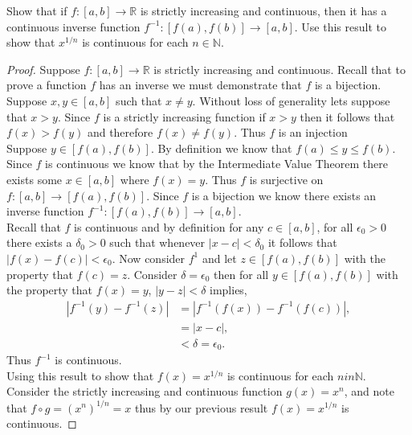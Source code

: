 \documentclass[12pt]{article}
\makeatletter
\theoremstyle{homework}
\newenvironment{exercise}[1]
{\def\@currentlabel{#1}\exercisecore}
{\endexercisecore}
\newcommand{\Reals}{\ensuremath{\mathbb R}}
\newcommand{\Nats}{\ensuremath{\mathbb N}}
\makeatother
\begin{document}
\begin{exercise}{6} Show that if $f:[a,b] \to \Reals$ is strictly increasing and continuous, then it has a continuous inverse function $f^{-1}:[f(a),f(b)] \to [a,b]$. Use this result to show that $x^{1/n}$ is continuous for each $n\in \Nats$.\\

\begin{proof}
  Suppose $f:[a,b] \to \Reals$ is strictly increasing and continuous. Recall that to prove a function $f$ has an inverse we must demonstrate
  that $f$ is a bijection.\\
  
  Suppose $x,y \in [a,b]$ such that $x \neq y$. Without loss of generality lets suppose that $x > y$. Since $f$ is a strictly increasing function if 
  $x > y$ then it follows that $f(x) > f(y)$ and therefore $f(x) \neq f(y)$. Thus $f$ is an injection\\

  Suppose $y \in  [f(a),f(b)]$. By definition we know that $f(a) \le y \le f(b)$. Since $f$ is continuous we know that by the Intermediate Value Theorem there exists some 
  $x \in [a,b]$ where $f(x) = y$. Thus $f$ is surjective on $f:[a,b] \to [f(a),f(b)]$. Since $f$ is a bijection we know there exists an inverse function $f^{-1}:[f(a),f(b)] \to [a,b]$.\\

 Recall that $f$ is continuous and by definition for any $c \in [a,b]$, for all $\epsilon_0 >0$ there exists a $\delta_0> 0$ such that whenever $|x - c|<\delta_0$ it follows that $|f(x) - f(c)|< \epsilon_0$.
 Now consider $f^{1}$ and let $z \in [f(a),f(b)]$ with the property that $f(c) = z$. Consider $\delta = \epsilon_0$ then for all $y \in [f(a),f(b)]$ with the property that $f(x) = y$, $|y - z|< \delta$ implies,
  \begin{align*}
   |f^{-1}(y) - f^{-1}(z)| &= |f^{-1}(f(x)) - f^{-1}(f(c))|,\\
   &= |x - c|,\\
   &< \delta = \epsilon_0.
   \end{align*} 
Thus $f^{-1}$ is continuous. \\

Using this result to show that $f(x) = x^{1/n}$ is continuous for each $n in \Nats$. Consider the strictly increasing and continuous function $g(x) = x^n$, and note that $f \circ g = (x^n)^{1/n} = x$ thus by 
our previous result  $f(x) = x^{1/n}$ is continuous.

\end{proof}
\end{exercise}
\vspace{.5in}
\end{document}
